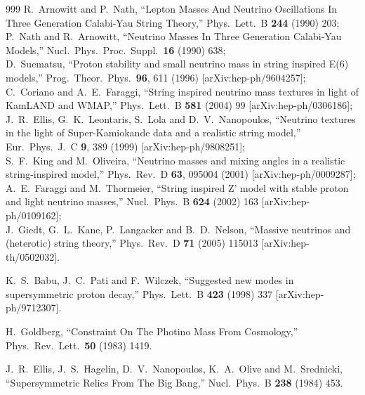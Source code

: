 \begin{thebibliography}{999}
  R.~Arnowitt and P.~Nath,
  ``Lepton Masses And Neutrino Oscillations In Three Generation Calabi-Yau
  String Theory,''
  Phys.\ Lett.\ B {\bf 244} (1990) 203;
 P.~Nath and R.~Arnowitt,
  ``Neutrino Masses In Three Generation Calabi-Yau Models,''
  Nucl.\ Phys.\ Proc.\ Suppl.\  {\bf 16} (1990) 638;
\\
D.~Suematsu,
  ``Proton stability and small neutrino mass in string inspired E(6)  models,''
  Prog.\ Theor.\ Phys.\  {\bf 96}, 611 (1996)
  [arXiv:hep-ph/9604257];
\\
C.~Coriano and A.~E.~Faraggi,
  ``String inspired neutrino mass textures in light of KamLAND and WMAP,''
  Phys.\ Lett.\ B {\bf 581} (2004) 99
  [arXiv:hep-ph/0306186];
\\
J.~R.~Ellis, G.~K.~Leontaris, S.~Lola and D.~V.~Nanopoulos,
  ``Neutrino textures in the light of Super-Kamiokande data and a realistic
  string model,''
  Eur.\ Phys.\ J.\ C {\bf 9}, 389 (1999)
  [arXiv:hep-ph/9808251];
\\
 S.~F.~King and M.~Oliveira,
  ``Neutrino masses and mixing angles in a realistic string-inspired model,''
  Phys.\ Rev.\ D {\bf 63}, 095004 (2001)
  [arXiv:hep-ph/0009287];
\\
  A.~E.~Faraggi and M.~Thormeier,
  ``String inspired Z' model with stable proton and light neutrino  masses,''
  Nucl.\ Phys.\ B {\bf 624} (2002) 163
  [arXiv:hep-ph/0109162];
\\
 J.~Giedt, G.~L.~Kane, P.~Langacker and B.~D.~Nelson,
  ``Massive neutrinos and (heterotic) string theory,''
  Phys.\ Rev.\ D {\bf 71} (2005) 115013
  [arXiv:hep-th/0502032].

  K.~S.~Babu, J.~C.~Pati and F.~Wilczek,
  ``Suggested new modes in supersymmetric proton decay,''
  Phys.\ Lett.\ B {\bf 423} (1998) 337
  [arXiv:hep-ph/9712307].

  H.~Goldberg,
  ``Constraint On The Photino Mass From Cosmology,''
  Phys.\ Rev.\ Lett.\  {\bf 50} (1983) 1419.

  J.~R.~Ellis, J.~S.~Hagelin, D.~V.~Nanopoulos, K.~A.~Olive and M.~Srednicki,
  ``Supersymmetric Relics From The Big Bang,''
  Nucl.\ Phys.\ B {\bf 238} (1984) 453.


\end{thebibliography}
